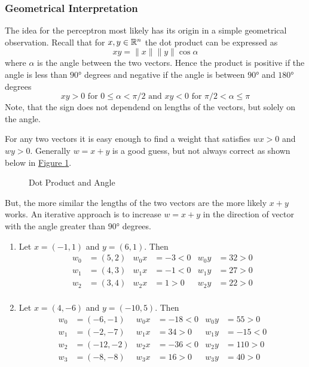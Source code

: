 \subsubsection*{Geometrical Interpretation}
The idea for the perceptron most likely has its origin in a simple geometrical observation.
Recall that for \( x, y \in \mathbb{R}^n \) the dot product can be expressed as 
\[
	xy = \|x\| \|y\| \cos \alpha 
\]
where \( \alpha \) is the angle between the two vectors. Hence the product is positive 
if the angle is less than \( \ang{90} \) degrees and negative if the angle is between \( \ang{90} \) 
and \( \ang{180} \) degrees
\[
	xy > 0 \text{ for } 0 \le \alpha < \pi / 2 \text{ and } xy < 0 \text{ for } \pi / 2 < \alpha \le \pi
\]
Note, that the sign does not dependend on lengths of the vectors, but solely on the angle.

For any two vectors it is easy enough to find a weight that satisfies \( wx > 0 \) and \( wy > 0 \). 
Generally \( w = x + y \) is a good guess, but not always correct as shown below in 
\hyperref[fig:vectorangle]{Figure \ref*{fig:vectorangle}}. 

\bigskip
\begin{figure}[H]
	\centering
	\plotvectorangle
	\caption{Dot Product and Angle}\label{fig:vectorangle}
\end{figure}
\bigskip

But, the more similar the lengths of the two vectors are the more likely \( x + y \) works. 
An iterative approach is to increase \( w = x + y \) in the direction of vector with the angle greater 
than \( \ang{90} \) degrees.

\begin{examples}\hfill
    \begin{enumerate}
        \item Let \( x = (-1, 1) \) and \( y = (6, 1) \). Then 
			\[ 
				\begin{align*}
					w_0 &= (5, 2) & w_0x &= -3 < 0 & w_0y &= 32 > 0 \\
					w_1 &= (4, 3) & w_1x &= -1 < 0 & w_1y &= 27 > 0 \\
					w_2 &= (3, 4) & w_2x &= 1 > 0 & w_2y &= 22 > 0 \\
				\end{align*}
			\]
        \item Let \( x = (4, -6) \) and \( y = (-10, 5) \). Then 
			\[ 
				\begin{align*}
					w_0 &= (-6, -1) & w_0x &= -18 < 0 & w_0y &= 55 > 0 \\
					w_1 &= (-2, -7) & w_1x &= 34 > 0 & w_1y &= -15 < 0 \\
					w_2 &= (-12, -2) & w_2x &= -36 < 0 & w_2y &= 110 > 0 \\
					w_3 &= (-8, -8) & w_3x &= 16 > 0 & w_3y &= 40 > 0 \\
   				\end{align*}
			\]
    \end{enumerate}
\end{examples}
	

